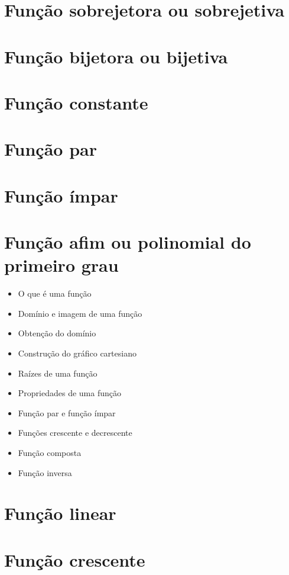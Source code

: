 \documentclass[11pt,fleqn]{book}
\begin{document}
\chapter{Função sobrejetora ou sobrejetiva}

\chapter{Função bijetora ou bijetiva}

\chapter{Função constante}

\chapter{Função par}

\chapter{Função ímpar}

\chapter{Função afim ou polinomial do primeiro grau}
    \begin{itemize}
    	\item O que é uma função
    	\item Domínio e imagem de uma função
    	\item Obtenção do domínio
    	\item Construção do gráfico cartesiano
    	\item Raízes de uma função
    	\item Propriedades de uma função
    	\item Função par e função ímpar
    	\item Funções crescente e decrescente
    	\item Função composta
    	\item Função inversa
    \end{itemize}

\chapter{Função linear}

\chapter{Função crescente}
\end{document}
